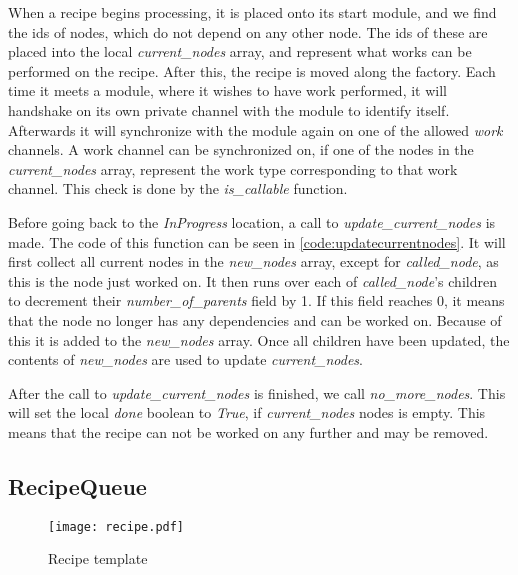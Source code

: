When a recipe begins processing, it is placed onto its start module, and we find the ids of nodes, which do not depend on any other node. The ids of these are placed into the local \emph{current\_nodes} array, and represent what works can be performed on the recipe. After this, the recipe is moved along the factory. Each time it meets a module, where it wishes to have work performed, it will handshake on its own private channel with the module to identify itself. Afterwards it will synchronize with the module again on one of the allowed \emph{work} channels. A work channel can be synchronized on, if one of the nodes in the \emph{current\_nodes} array, represent the work type corresponding to that work channel. This check is done by the \emph{is\_callable} function.

Before going back to the \emph{InProgress} location, a call to \emph{update\_current\_nodes} is made. The code of this function can be seen in \cref{code:updatecurrentnodes}. It will first collect all current nodes in the \emph{new\_nodes} array, except for \emph{called\_node}, as this is the node just worked on. It then runs over each of \emph{called\_node}'s children to decrement their \emph{number\_of\_parents} field by 1. If this field reaches 0, it means that the node no longer has any dependencies and can be worked on. Because of this it is added to the \emph{new\_nodes} array. Once all children have been updated, the contents of \emph{new\_nodes} are used to update \emph{current\_nodes}.  



After the call to \emph{update\_current\_nodes} is finished, we call \emph{no\_more\_nodes}. This will set the local \emph{done} boolean to \emph{True}, if \emph{current\_nodes} nodes is empty. This means that the recipe can not be worked on any further and may be removed.

\subsection{RecipeQueue}\label{subs:recipequeue}

\begin{figure}[h]
\centering
\texttt{[image: recipe.pdf]}
\caption{Recipe template}
\label{fig:recipe}
\end{figure}

